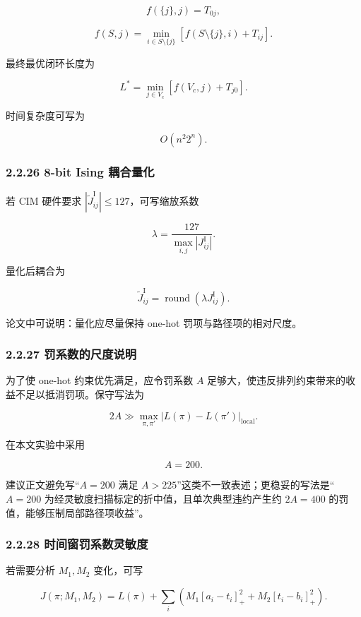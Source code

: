 \documentclass[
  a4paper,
]{ctexart}
\begin{document}
\[
f(\{j\},j)=T_{0j},
\]

\[
f(S,j)=\min_{i\in S\setminus\{j\}}\left[f(S\setminus\{j\},i)+T_{ij}\right].
\]

最终最优闭环长度为

\[
L^*=\min_{j\in V_c}\left[f(V_c,j)+T_{j0}\right].
\]

时间复杂度可写为

\[
O(n^2 2^n).
\]

\subsubsection{2.2.26 8-bit Ising
耦合量化}\label{bit-ising-ux8026ux5408ux91cfux5316}

若 CIM 硬件要求 \(|\tilde J_{ij}^{\mathrm{I}}|\le 127\)，可写缩放系数

\[
\lambda=\frac{127}{\max_{i,j}|J_{ij}^{\mathrm{I}}|}.
\]

量化后耦合为

\[
\tilde J_{ij}^{\mathrm{I}}=\operatorname{round}(\lambda J_{ij}^{\mathrm{I}}).
\]

论文中可说明：量化应尽量保持 one-hot 罚项与路径项的相对尺度。

\subsubsection{2.2.27
罚系数的尺度说明}\label{ux7f5aux7cfbux6570ux7684ux5c3aux5ea6ux8bf4ux660e}

为了使 one-hot 约束优先满足，应令罚系数 \(A\)
足够大，使违反排列约束带来的收益不足以抵消罚项。保守写法为

\[
2A \gg \max_{\pi,\pi'}|L(\pi)-L(\pi')|_{\mathrm{local}}.
\]

在本文实验中采用

\[
A=200.
\]

建议正文避免写``\(A=200\) 满足
\(A>225\)''这类不一致表述；更稳妥的写法是``\(A=200\)
为经灵敏度扫描标定的折中值，且单次典型违约产生约 \(2A=400\)
的罚值，能够压制局部路径项收益''。

\subsubsection{2.2.28
时间窗罚系数灵敏度}\label{ux65f6ux95f4ux7a97ux7f5aux7cfbux6570ux7075ux654fux5ea6}

若需要分析 \(M_1,M_2\) 变化，可写

\[
J(\pi;M_1,M_2)=L(\pi)+\sum_i\left(M_1[a_i-t_i]_+^2+M_2[t_i-b_i]_+^2\right).
\]
\end{document}
